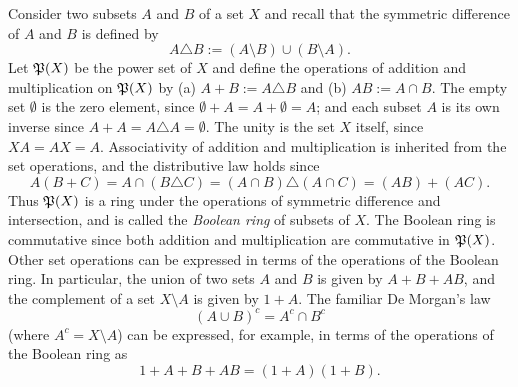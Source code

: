 \begin{example}
    Consider two subsets \(A\) and \(B\) of a set \(X\) and recall that the
    symmetric difference of \(A\) and \(B\) is defined by
    \[
        A \triangle B := (A \setminus B) \cup (B \setminus A).
    \]
    Let \(\mathfrak{P}(X)\) be the power set of \(X\) and define the operations of
    addition and multiplication on \(\mathfrak{P}(X)\) by (a) \(A + B := A \triangle
    B\) and (b) \(AB := A \cap B\). The empty set \(\emptyset\) is the zero
    element, since \(\emptyset + A = A + \emptyset = A\); and each subset \(A\)
    is its own inverse since \(A + A = A \triangle A = \emptyset\). The unity is
    the set \(X\) itself, since \(X A = A X = A\). Associativity of addition and
    multiplication is inherited from the set operations, and the distributive
    law holds since
    \[
        A (B + C) = A \cap (B \triangle C) = (A \cap B) \triangle (A \cap C) = (A B) + (A C).
    \]
    Thus \(\mathfrak{P}(X)\) is a ring under the operations of symmetric difference
    and intersection, and is called the \emph{Boolean ring} of subsets of \(X\).
    The Boolean ring is commutative since both addition and multiplication are
    commutative in \(\mathfrak{P}(X)\). Other set operations can be expressed in terms
    of the operations of the Boolean ring. In particular, the union of two sets
    \(A\) and \(B\) is given by \(A + B + AB\), and the complement of a set \(X
    \setminus A\) is given by \(1 + A\). The familiar De Morgan's law
    \[
        (A \cup B)^c = A^c \cap B^c
    \]
    (where \(A^c = X\setminus A\)) can be expressed, for example, in terms of
    the operations of the Boolean ring as
    \[
        1 + A + B + AB = (1 + A)(1 + B).
    \]
\end{example}

